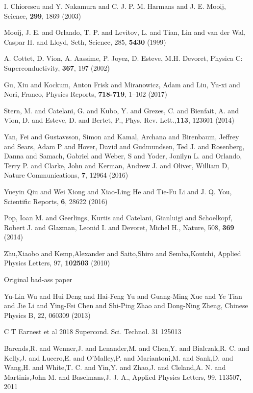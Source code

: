 \begin{thebibliography}{99}
  {I.  Chiorescu  and Y.   Nakamura  and C.   J.  P.   M.  Harmans  and
    J. E. Mooij}, {Science}, \textbf{299}, 1869 (2003)

 {Mooij, J. E. and Orlando, T. P. and Levitov, L. and Tian, Lin and van der
    Wal, Caspar H.  and Lloyd, Seth}, {Science}, 285, \textbf{5430} (1999)
	
 A.  Cottet,  D. Vion, A.  Aassime, P.  Joyez,  D.  Esteve, M.H.  Devoret,
  Physica C: Superconductivity, \textbf{367}, 197 (2002)

 Gu, Xiu and Kockum, Anton Frisk and Miranowicz, Adam and Liu, Yu-xi and Nori,
  Franco, Physics Reports, \textbf{718-719}, 1--102 (2017)

 Stern, M. and Catelani, G.  and  Kubo, Y. and Grezes, C.  and Bienfait, A.
  and Vion, D.  and Esteve, D.  and Bertet, P., Phys. Rev. Lett.,\textbf{113}, 123601 (2014)

 Yan, Fei and Gustavsson, Simon and Kamal, Archana and Birenbaum, Jeffrey and
  Sears, Adam  P and  Hover, David  and Gudmundsen, Ted  J. and  Rosenberg, Danna  and Samach,
  Gabriel and  Weber, S and  Yoder, Jonilyn L.   and Orlando, Terry  P.  and Clarke,  John and
  Kerman, Andrew J.  and Oliver, William D, Nature Communications, \textbf{7}, 12964 (2016)

 Yueyin  Qiu and Wei  Xiong and Xiao-Ling  He and Tie-Fu  Li and J.   Q. You,
  Scientific Reports, \textbf{6}, 28622 (2016)

 Pop, Ioan  M. and Geerlings, Kurtis and Catelani,  Gianluigi and Schoelkopf,
  Robert J. and Glazman, Leonid I. and Devoret, Michel H., Nature, 508, \textbf{369} (2014)


  Zhu,Xiaobo and  Kemp,Alexander and  Saito,Shiro and  Semba,Kouichi, Applied
  Physics Letters, 97, \textbf{102503} (2010)


 Original bad-ass paper


 {Yu-Lin Wu  and Hui Deng and Hai-Feng  Yu and Guang-Ming Xue and  Ye Tian and
    Jie Li  and Ying-Fei  Chen and Shi-Ping  Zhao and Dong-Ning  Zheng}, {Chinese  Physics B},
  {22}, {060309} (2013)

 C T Earnest et al 2018 Supercond. Sci. Technol. 31 125013
  
  {Barends,R.    and  Wenner,J.    and  Lenander,M.   and   Chen,Y.   and
    Bialczak,R.   C.  and  Kelly,J.  and  Lucero,E.  and  O'Malley,P.  and  Mariantoni,M.  and
    Sank,D.  and Wang,H.  and  White,T.  C.  and Yin,Y.  and Zhao,J.   and Cleland,A.  N.  and
    Martinis,John M. and Baselmans,J.  J. A.}, {Applied Physics Letters}, 99, {113507}, {2011}


\end{thebibliography}
